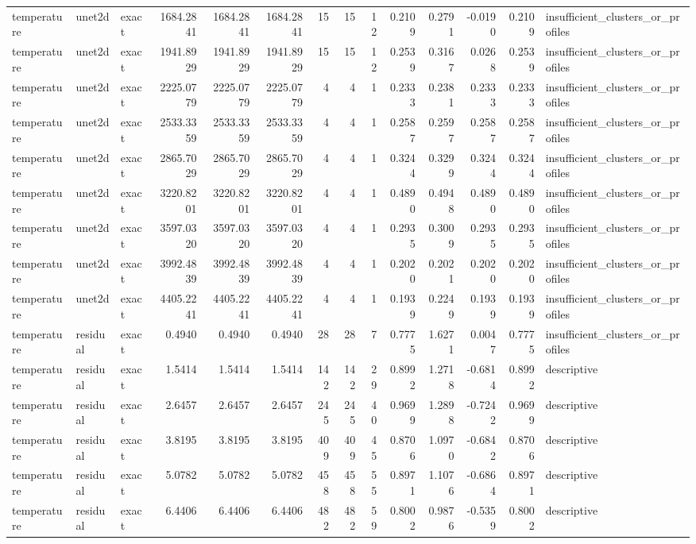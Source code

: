 \begin{tabular}{lllrrrrrrrrrrl}
temperature & unet2d & exact & 1684.2841 & 1684.2841 & 1684.2841 & 15 & 15 & 12 & 0.2109 & 0.2791 & -0.0190 & 0.2109 & insufficient_clusters_or_profiles \\
temperature & unet2d & exact & 1941.8929 & 1941.8929 & 1941.8929 & 15 & 15 & 12 & 0.2539 & 0.3167 & 0.0268 & 0.2539 & insufficient_clusters_or_profiles \\
temperature & unet2d & exact & 2225.0779 & 2225.0779 & 2225.0779 & 4 & 4 & 1 & 0.2333 & 0.2381 & 0.2333 & 0.2333 & insufficient_clusters_or_profiles \\
temperature & unet2d & exact & 2533.3359 & 2533.3359 & 2533.3359 & 4 & 4 & 1 & 0.2587 & 0.2597 & 0.2587 & 0.2587 & insufficient_clusters_or_profiles \\
temperature & unet2d & exact & 2865.7029 & 2865.7029 & 2865.7029 & 4 & 4 & 1 & 0.3244 & 0.3299 & 0.3244 & 0.3244 & insufficient_clusters_or_profiles \\
temperature & unet2d & exact & 3220.8201 & 3220.8201 & 3220.8201 & 4 & 4 & 1 & 0.4890 & 0.4948 & 0.4890 & 0.4890 & insufficient_clusters_or_profiles \\
temperature & unet2d & exact & 3597.0320 & 3597.0320 & 3597.0320 & 4 & 4 & 1 & 0.2935 & 0.3009 & 0.2935 & 0.2935 & insufficient_clusters_or_profiles \\
temperature & unet2d & exact & 3992.4839 & 3992.4839 & 3992.4839 & 4 & 4 & 1 & 0.2020 & 0.2021 & 0.2020 & 0.2020 & insufficient_clusters_or_profiles \\
temperature & unet2d & exact & 4405.2241 & 4405.2241 & 4405.2241 & 4 & 4 & 1 & 0.1939 & 0.2249 & 0.1939 & 0.1939 & insufficient_clusters_or_profiles \\
temperature & residual & exact & 0.4940 & 0.4940 & 0.4940 & 28 & 28 & 7 & 0.7775 & 1.6271 & 0.0047 & 0.7775 & insufficient_clusters_or_profiles \\
temperature & residual & exact & 1.5414 & 1.5414 & 1.5414 & 142 & 142 & 29 & 0.8992 & 1.2718 & -0.6814 & 0.8992 & descriptive \\
temperature & residual & exact & 2.6457 & 2.6457 & 2.6457 & 245 & 245 & 40 & 0.9699 & 1.2898 & -0.7242 & 0.9699 & descriptive \\
temperature & residual & exact & 3.8195 & 3.8195 & 3.8195 & 409 & 409 & 45 & 0.8706 & 1.0970 & -0.6842 & 0.8706 & descriptive \\
temperature & residual & exact & 5.0782 & 5.0782 & 5.0782 & 458 & 458 & 55 & 0.8971 & 1.1076 & -0.6864 & 0.8971 & descriptive \\
temperature & residual & exact & 6.4406 & 6.4406 & 6.4406 & 482 & 482 & 59 & 0.8002 & 0.9876 & -0.5359 & 0.8002 & descriptive \\

\end{tabular}
